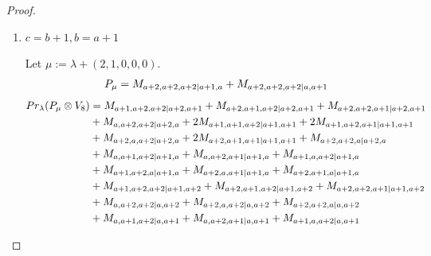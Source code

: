 \begin{proof}
\begin{enumerate}
\begin{enumerate}
\begin{table}[htbp]
\begin{tabular}{cc}
{ $M_{c,a+2,a+2|a+2,a+2}$
}\\
 & \\
 $P_{c,a+1,a+1|a+1,a+1}$ & \makecell{
 $M_{c,a+2,a+1|a+2,a+1}$,
 $M_{c,a+2,a+1|a+1,a+2}$,
 $M_{c,a+1,a+2|a+2,a+1}$,
 $M_{c,a+1,a+2|a+1,a+2}$, \\
 $M_{c,a+2,a+2|a+2,a+2}$
}\\
\bottomrule
\end{tabular}
\vspace{0.5em}
\parbox{\linewidth}{\small
\textbf{Interpretation:}
This table displays only selected computational results. This partial presentation does not affect our conclusion.
}
\end{table}

        \item $c=b+1, b=a+1$ \par
        Let $\mu:=\lambda + (2,1,0,0,0) $.
        \begin{equation}\notag
          \begin{aligned}
            P_\mu = M_{a+2,a+2,a+2|a+1,a}
+ M_{a+2,a+2,a+2|a,a+1}
          \end{aligned}
        \end{equation}
        \begin{equation}\notag
          \begin{aligned}
            Pr_{\lambda}(P_\mu \otimes V_{8}) &=
M_{a+1,a+2,a+2|a+2,a+1}
+ M_{a+2,a+1,a+2|a+2,a+1}
+ M_{a+2,a+2,a+1|a+2,a+1}\\
                                              &
+ M_{a,a+2,a+2|a+2,a}
+ 2M_{a+1,a+1,a+2|a+1,a+1}
+ 2M_{a+1,a+2,a+1|a+1,a+1}\\
                                              &
+ M_{a+2,a,a+2|a+2,a}
+ 2M_{a+2,a+1,a+1|a+1,a+1}
+ M_{a+2,a+2,a|a+2,a}\\
                                              &
+ M_{a,a+1,a+2|a+1,a}
+ M_{a,a+2,a+1|a+1,a}
+ M_{a+1,a,a+2|a+1,a}\\
                                              &
+ M_{a+1,a+2,a|a+1,a}
+ M_{a+2,a,a+1|a+1,a}
+ M_{a+2,a+1,a|a+1,a}\\
                                              &
+ M_{a+1,a+2,a+2|a+1,a+2}
+ M_{a+2,a+1,a+2|a+1,a+2}
+ M_{a+2,a+2,a+1|a+1,a+2}\\
                                              &
+ M_{a,a+2,a+2|a,a+2}
+ M_{a+2,a,a+2|a,a+2}
+ M_{a+2,a+2,a|a,a+2}\\
                                              &
+ M_{a,a+1,a+2|a,a+1}
+ M_{a,a+2,a+1|a,a+1}
+ M_{a+1,a,a+2|a,a+1}\\

\end{aligned}
\end{equation}
\end{enumerate}
\end{enumerate}
\end{proof}
